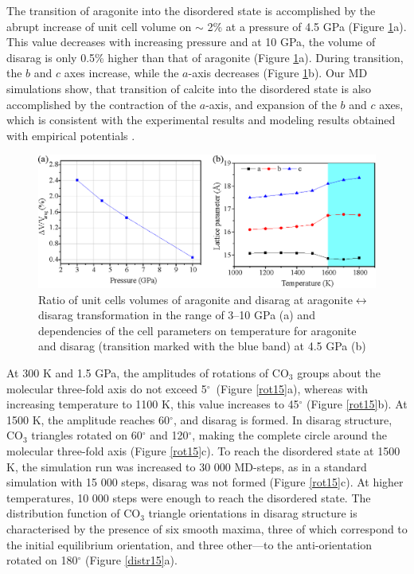 \documentclass[journal=jacsat,manuscript=article]{achemso}
\begin{document}
The transition of aragonite into the disordered state is accomplished by the abrupt increase of unit cell volume on $\sim$ 2\% at a pressure of 4.5 GPa (Figure \ref{arag_cell}a).
This value decreases with increasing pressure and at 10 GPa, the volume of disarag is only 0.5\% higher than that of aragonite (Figure \ref{arag_cell}a). 
During transition, the $b$ and $c$ axes increase, while the $a$-axis decreases (Figure \ref{arag_cell}b). 
Our MD simulations show, that transition of calcite into the disordered state is also accomplished by the contraction of the $a$-axis, and expansion of the $b$ and $c$ axes, which is consistent with the experimental results \cite{antao2009} and modeling results obtained with empirical potentials \cite{kawano2009}.

\begin{figure}[H]
\includegraphics[width=\textwidth]{arag_cell} \centering
\caption{ Ratio of unit cells volumes of aragonite and disarag at aragonite$\leftrightarrow$disarag transformation in the range of 3--10 GPa (a) and dependencies of the cell parameters on temperature for aragonite and disarag (transition marked with the blue band) at 4.5 GPa (b) } \label{arag_cell}
\end{figure}


At 300 K and 1.5 GPa, the amplitudes of rotations of CO$_3$ groups about the molecular three-fold axis do not exceed 5$^{\circ}$\ (Figure \ref{rot15}a), whereas with increasing temperature to 1100 K, this value increases to 45$^{\circ}$ (Figure \ref{rot15}b). 
At 1500 K, the amplitude reaches 60$^{\circ}$, and disarag is formed. 
In disarag structure, CO$_3$ triangles rotated on 60$^{\circ}$ and 120$^{\circ}$, making the complete circle around the molecular three-fold axis (Figure \ref{rot15}c). 
To reach the disordered state at 1500 K, the simulation run was increased to 30 000 MD-steps, as in a standard simulation with 15 000 steps, disarag was not formed (Figure \ref{rot15}c).
At higher temperatures, 10 000 steps were enough to reach the disordered state.
The distribution function of CO$_3$ triangle orientations in disarag structure is characterised by the presence of six smooth maxima, three of which correspond to the initial equilibrium orientation, and three other---to the anti-orientation rotated on 180$^{\circ}$ (Figure  \ref{distr15}a).
\end{document}
